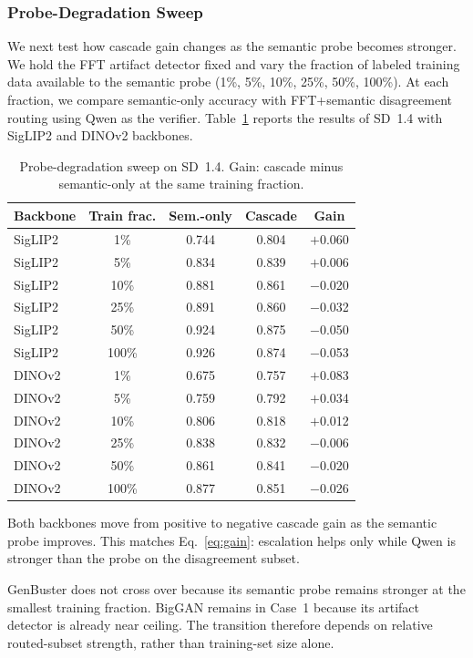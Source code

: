 \documentclass{ieeeaccess}
\begin{document}
\subsubsection{Probe-Degradation Sweep}
\label{sec:limited_data}

We next test how cascade gain changes as the semantic probe becomes stronger. We hold
the FFT artifact detector fixed and vary the fraction of labeled training data available
to the semantic probe (1\%, 5\%, 10\%, 25\%, 50\%, 100\%). At each fraction, we compare
semantic-only accuracy with FFT+semantic disagreement routing using Qwen as the verifier.
Table~\ref{tab:limited_data} reports the results of SD~1.4 with SigLIP2 and DINOv2
backbones.

\begin{table}[h]
\centering
\caption{Probe-degradation sweep on SD~1.4. Gain: cascade minus semantic-only at the same training fraction.}
\label{tab:limited_data}
\small
\begin{tabular}{lcccc}
\toprule
Backbone & Train frac. & Sem.-only & Cascade & Gain \\
\midrule
SigLIP2  & 1\%   & 0.744 & 0.804 & $+$0.060 \\
SigLIP2 & 5\% & 0.834 & 0.839 & $+$0.006 \\
SigLIP2  & 10\%  & 0.881 & 0.861 & $-$0.020 \\
SigLIP2 & 25\% & 0.891 & 0.860 & $-$0.032 \\
SigLIP2 & 50\% & 0.924 & 0.875 & $-$0.050 \\
SigLIP2 & 100\% & 0.926 & 0.874 & $-$0.053 \\
\midrule
DINOv2   & 1\%   & 0.675 & 0.757 & $+$0.083 \\
DINOv2   & 5\%   & 0.759 & 0.792 & $+$0.034 \\
DINOv2 & 10\% & 0.806 & 0.818 & $+$0.012 \\
DINOv2   & 25\%  & 0.838 & 0.832 & $-$0.006 \\
DINOv2   & 50\%  & 0.861 & 0.841 & $-$0.020 \\
DINOv2 & 100\% & 0.877 & 0.851 & $-$0.026 \\
\bottomrule
\end{tabular}
\end{table}

Both backbones move from positive to negative cascade gain as the semantic probe
improves. This matches Eq.~\eqref{eq:gain}: escalation helps only while Qwen is stronger
than the probe on the disagreement subset.

GenBuster does not cross over because its semantic probe remains stronger at the smallest
training fraction. BigGAN remains in Case~1 because its artifact detector is already near
ceiling. The transition therefore depends on relative routed-subset strength, rather than
training-set size alone.
\end{document}
